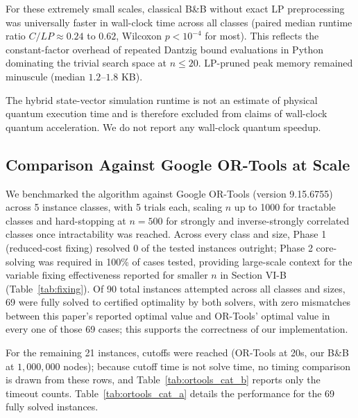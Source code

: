 \documentclass[conference]{IEEEtran}
\begin{document}
For these extremely small scales, classical B\&B without exact LP preprocessing was universally faster in wall-clock time across all classes (paired median runtime ratio $C/LP \approx 0.24$ to $0.62$, Wilcoxon $p < 10^{-4}$ for most). This reflects the constant-factor overhead of repeated Dantzig bound evaluations in Python dominating the trivial search space at $n \le 20$. LP-pruned peak memory remained minuscule (median $1.2\text{--}1.8$ KB). 

The hybrid state-vector simulation runtime is not an estimate of physical quantum execution time and is therefore excluded from claims of wall-clock quantum acceleration. We do not report any wall-clock quantum speedup.

\subsection{Comparison Against Google OR-Tools at Scale}

We benchmarked the algorithm against Google OR-Tools (version 9.15.6755) across 5 instance classes, with 5 trials each, scaling $n$ up to 1000 for tractable classes and hard-stopping at $n=500$ for strongly and inverse-strongly correlated classes once intractability was reached. Across every class and size, Phase 1 (reduced-cost fixing) resolved 0 of the tested instances outright; Phase 2 core-solving was required in 100\% of cases tested, providing large-scale context for the variable fixing effectiveness reported for smaller $n$ in Section VI-B (Table~\ref{tab:fixing}). Of 90 total instances attempted across all classes and sizes, 69 were fully solved to certified optimality by both solvers, with zero mismatches between this paper's reported optimal value and OR-Tools' optimal value in every one of those 69 cases; this supports the correctness of our implementation. 

For the remaining 21 instances, cutoffs were reached (OR-Tools at 20s, our B\&B at $1{,}000{,}000$ nodes); because cutoff time is not solve time, no timing comparison is drawn from these rows, and Table~\ref{tab:ortools_cat_b} reports only the timeout counts. Table~\ref{tab:ortools_cat_a} details the performance for the 69 fully solved instances.
\end{document}
